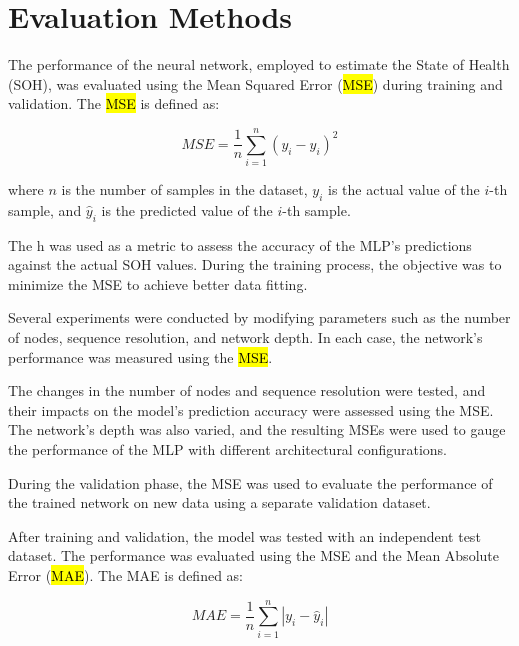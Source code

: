 \documentclass[energies,article,accept,pdftex,moreauthors]{Definitions/mdpi}
\begin{document}
\section{Evaluation Methods}

The performance of the neural network, employed to estimate the State of Health (SOH), was evaluated using the Mean Squared Error (\hl{MSE}) during training and validation. The \hl{MSE} is defined as: %
\begin{linenomath}
\begin{equation}
MSE = \frac{1}{n} \sum_{i=1}^{n}(y_i - \hat{y}_i)^2
\end{equation}
\end{linenomath}
where $n$ is the number of samples in the dataset, $y_i$ is the actual value of the $i$-th sample, and $\hat{y}_i$ is the predicted value of the $i$-th sample.

The h was used as a metric to assess the accuracy of the MLP's predictions against the actual SOH values. During the training process, the objective was to minimize the MSE to achieve better data fitting.

Several experiments were conducted by modifying parameters such as the number of nodes, sequence resolution, and network depth. In each case, the network's performance was measured using the \hl{MSE}.

The changes in the number of nodes and sequence resolution were tested, and their impacts on the model's prediction accuracy were assessed using the MSE. The network's depth was also varied, and the resulting MSEs were used to gauge the performance of the MLP with different architectural configurations.

During the validation phase, the MSE was used to evaluate the performance of the trained network on new data using a separate validation dataset.

After training and validation, the model was tested with an independent test dataset. The performance was evaluated using the MSE and the Mean Absolute Error (\hl{MAE}). The MAE is defined as:

\begin{linenomath}
\begin{equation}
MAE = \frac{1}{n} \sum_{i=1}^{n} |y_i - \hat{y}_i|
\end{equation}
\end{linenomath}
\end{document}
